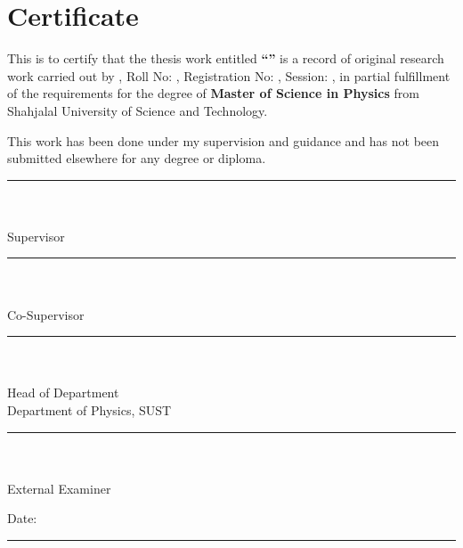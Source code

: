
\chapter*{Certificate}

This is to certify that the thesis work entitled \textbf{``\printtitle''} is a record of original research work carried out by \textbf{\printauthor}, Roll No: \textbf{\printroll}, Registration No: \textbf{\printreg}, Session: \textbf{\printsession}, in partial fulfillment of the requirements for the degree of \textbf{Master of Science in Physics} from Shahjalal University of Science and Technology.

This work has been done under my supervision and guidance and has not been submitted elsewhere for any degree or diploma.

\vspace{1.0in}

\noindent
\begin{minipage}[t]{\textwidth}
    \centering
    \rule{6cm}{0.4pt} \\
    \textbf{\printsupervisor} \\
    Supervisor \\
    \printsupervisordesig
\end{minipage}

\ifx\printcosupervisor\empty
\else
    \vspace{1.0in}

    \noindent
    \begin{minipage}[t]{\textwidth}
        \centering
        \rule{6cm}{0.4pt} \\
        \textbf{\printcosupervisor} \\
        Co-Supervisor \\
        \printcosupervisordesig
    \end{minipage}
\fi

\vspace{1.0in}

\noindent
\begin{minipage}[t]{\textwidth}
    \centering
    \rule{6cm}{0.4pt} \\
    \textbf{\printhead} \\
    Head of Department \\
    Department of Physics, SUST
\end{minipage}

\ifx\printexternal\empty
\else
    \vspace{1.0in}

    \noindent
    \begin{minipage}[t]{\textwidth}
        \centering
        \rule{6cm}{0.4pt} \\
        \textbf{\printexternal} \\
        External Examiner \\
        \printexternaldesig
    \end{minipage}
\fi

\vspace{0.8in}
\noindent
Date: \rule{4cm}{0.4pt}
